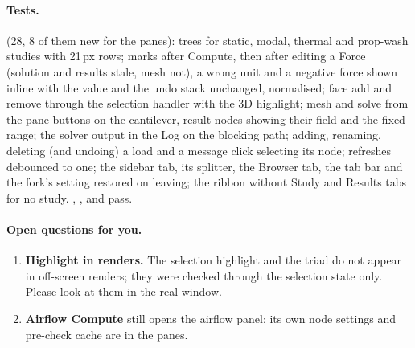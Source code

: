 \paragraph{Tests.}  (28, 8 of them new for the panes): trees for static, modal, thermal and
prop-wash studies with 21\,px rows; marks after Compute, then after editing a Force (solution and results stale, mesh not),
a wrong unit and a negative force shown inline with the value and the undo stack unchanged,  normalised;
face add and remove through the selection handler with the 3D highlight; mesh and solve from the pane buttons on the
cantilever, result nodes showing their field and the fixed range; the solver output in the Log on the blocking path;
adding, renaming, deleting (and undoing) a load and a message click selecting its node; refreshes debounced to one; the
sidebar tab, its splitter, the Browser tab, the tab bar and the fork's setting restored on leaving; the ribbon without Study
and Results tabs for no study. , , 
and  pass.

\paragraph{Open questions for you.}
\begin{enumerate}[nosep]
  \item \textbf{Highlight in renders.} The selection highlight and the triad do not appear in off-screen renders; they were
        checked through the selection state only. Please look at them in the real window.
  \item \textbf{Airflow Compute} still opens the airflow panel; its own node settings and pre-check cache are in the panes.
\end{enumerate}
